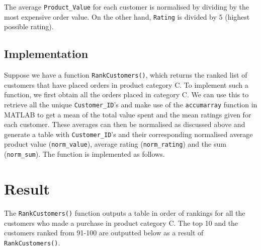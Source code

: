 \documentclass[11pt]{report}
\begin{document}
The average \texttt{Product\_Value} for each customer is normalised by dividing by the most expensive order value. On the other hand, \texttt{Rating} is divided by 5 (highest possible rating).

\subsection{Implementation}
Suppose we have a function \texttt{RankCustomers()}, which returns the ranked list of customers that have placed orders in product category C. To implement such a function, we first obtain all the orders placed in category C. We can use this to retrieve all the unique \texttt{Customer\_ID}'s and make use of the \texttt{accumarray} function in MATLAB to get a mean of the total value spent and the mean ratings given for each customer. These averages can then be normalised as discussed above and generate a table with \texttt{Customer\_ID}'s and their corresponding normalised average product value (\texttt{norm\_value}), average rating (\texttt{norm\_rating}) and the sum (\texttt{norm\_sum}). The function is implemented as follows. \\



\section{Result}
The \texttt{RankCustomers()} function outputs a table in order of rankings for all the customers who made a purchase in product category C. The top 10 and the customers ranked from 91-100 are outputted below as a result of \texttt{RankCustomers()}. \\
\end{document}
